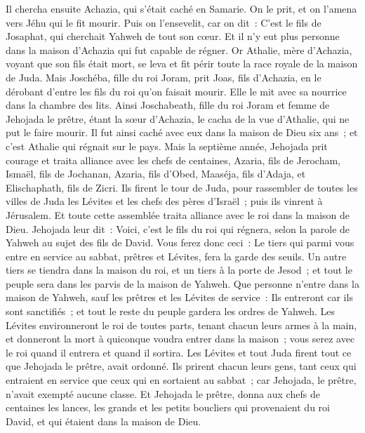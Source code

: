 \begin{multicols}{2}
Il chercha ensuite Achazia, qui s'était caché en Samarie. On le prit, et on l'amena vers Jéhu qui le fit mourir. Puis on l'ensevelit, car on dit~: C'est le fils de Josaphat, qui cherchait Yahweh de tout son cœur. Et il n'y eut plus personne dans la maison d'Achazia qui fut capable de régner.
Or Athalie, mère d'Achazia, voyant que son fils était mort, se leva et fit périr toute la race royale de la maison de Juda.
Mais Joschéba, fille du roi Joram, prit Joas, fils d'Achazia, en le dérobant d'entre les fils du roi qu'on faisait mourir. Elle le mit avec sa nourrice dans la chambre des lits. Ainsi Joschabeath, fille du roi Joram et femme de Jehojada le prêtre, étant la sœur d'Achazia, le cacha de la vue d'Athalie, qui ne put le faire mourir.
Il fut ainsi caché avec eux dans la maison de Dieu six ans~; et c'est Athalie qui régnait sur le pays.
\VerseOne{}Mais la septième année, Jehojada prit courage et traita alliance avec les chefs de centaines, Azaria, fils de Jerocham, Ismaël, fils de Jochanan, Azaria, fils d'Obed, Maaséja, fils d'Adaja, et Elischaphath, fils de Zicri.
Ils firent le tour de Juda, pour rassembler de toutes les villes de Juda les Lévites et les chefs des pères d'Israël~; puis ils vinrent à Jérusalem.
Et toute cette assemblée traita alliance avec le roi dans la maison de Dieu. Jehojada leur dit~: Voici, c'est le fils du roi qui régnera, selon la parole de Yahweh au sujet des fils de David.
Vous ferez donc ceci~: Le tiers qui parmi vous entre en service au sabbat, prêtres et Lévites, fera la garde des seuils.
Un autre tiers se tiendra dans la maison du roi, et un tiers à la porte de Jesod~; et tout le peuple sera dans les parvis de la maison de Yahweh.
Que personne n'entre dans la maison de Yahweh, sauf les prêtres et les Lévites de service~: Ils entreront car ils sont sanctifiés~; et tout le reste du peuple gardera les ordres de Yahweh.
Les Lévites environneront le roi de toutes parts, tenant chacun leurs armes à la main, et donneront la mort à quiconque voudra entrer dans la maison~; vous serez avec le roi quand il entrera et quand il sortira.
Les Lévites et tout Juda firent tout ce que Jehojada le prêtre, avait ordonné. Ils prirent chacun leurs gens, tant ceux qui entraient en service que ceux qui en sortaient au sabbat~; car Jehojada, le prêtre, n'avait exempté aucune classe.
Et Jehojada le prêtre, donna aux chefs de centaines les lances, les grands et les petits boucliers qui provenaient du roi David, et qui étaient dans la maison de Dieu.

\end{multicols}
